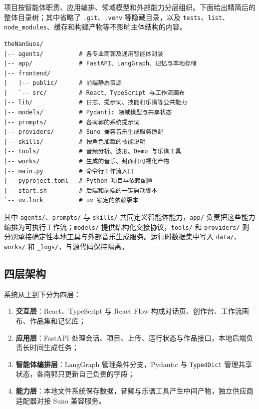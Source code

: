 \documentclass{SYSUReport}
\begin{document}
项目按智能体职责、应用编排、领域模型和外部能力分层组织。下面给出精简后的整体目录树；其中省略了 \verb|.git|、\verb|.venv| 等隐藏目录，以及 \verb|tests|、\verb|list|、\verb|node_modules|、缓存和构建产物等不影响主体结构的内容。

\begin{verbatim}
theNanGuos/
|-- agents/          # 各专业南郭及通用智能体封装
|-- app/             # FastAPI、LangGraph、记忆与本地存储
|-- frontend/
|   |-- public/      # 前端静态资源
|   `-- src/         # React、TypeScript 与工作流画布
|-- lib/             # 日志、提示词、技能和乐谱等公共能力
|-- models/          # Pydantic 领域模型与共享状态
|-- prompts/         # 各南郭的系统提示词
|-- providers/       # Suno 兼容音乐生成服务适配
|-- skills/          # 按角色加载的技能说明
|-- tools/           # 音频分析、波形、Demo 与乐谱工具
|-- works/           # 生成的音乐、封面和可视化产物
|-- main.py          # 命令行工作流入口
|-- pyproject.toml   # Python 项目与依赖配置
|-- start.sh         # 后端和前端的一键启动脚本
`-- uv.lock          # uv 锁定的依赖版本
\end{verbatim}

其中 \verb|agents/|、\verb|prompts/| 与 \verb|skills/| 共同定义智能体能力，\verb|app/| 负责把这些能力编排为可执行工作流；\verb|models/| 提供结构化交接协议，\verb|tools/| 和 \verb|providers/| 则分别承接确定性本地工具与外部音乐生成服务。运行时数据集中写入 \verb|data/|、\verb|works/| 和 \verb|_logs/|，与源代码保持隔离。

\subsection{四层架构}

系统从上到下分为四层：

\begin{enumerate}
    \item \textbf{交互层}：React、TypeScript 与 React Flow 构成对话页、创作台、工作流画布、作品集和记忆库；
    \item \textbf{应用层}：FastAPI 处理会话、项目、上传、运行状态与作品接口，本地后端负责长时间生成任务；
    \item \textbf{智能体编排层}：LangGraph 管理条件分支，Pydantic 与 \verb|TypedDict| 管理共享状态，各南郭只更新自己负责的字段；
    \item \textbf{能力层}：本地文件系统保存数据，音频与乐谱工具产生中间产物，独立供应商适配器对接 Suno 兼容服务。
\end{enumerate}
\end{document}
